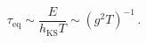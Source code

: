 \begin{equation}
\tau_\mathrm{eq} \sim \frac{E}{h_\mathrm{KS} T} \sim (g^2 T)^{-1}\, .
\label{eq36}
\end{equation}

